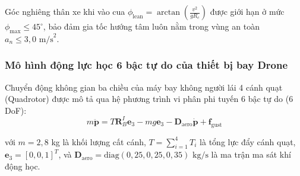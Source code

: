\begin{table}[H]
\centering
\caption{Đặc tính động học quay vòng của mô hình xe máy theo các góc bẻ lái $\delta_{\text{steer}}$}
\label{tab:motorcycle-turning-kinematics}
\end{table}

Góc nghiêng thân xe khi vào cua $\phi_{\text{lean}} = \arctan\left(\frac{v^2}{g R_c}\right)$ được giới hạn ở mức $\phi_{\max} \le 45^\circ$, bảo đảm gia tốc hướng tâm luôn nằm trong vùng an toàn $a_n \le 3{,}0\text{ m/s}^2$.

\subsubsection{Mô hình động lực học 6 bậc tự do của thiết bị bay Drone}

\hspace{0.5cm} Chuyển động không gian ba chiều của máy bay không người lái 4 cánh quạt (Quadrotor) được mô tả qua hệ phương trình vi phân phi tuyến 6 bậc tự do (6 DoF):
\begin{equation}
m \ddot{\mathbf{p}} = T \mathbf{R}_B^I \mathbf{e}_3 - m g \mathbf{e}_3 - \mathbf{D}_{\text{aero}} \dot{\mathbf{p}} + \mathbf{f}_{\text{gust}}
\label{eq:drone-6dof-translational-dynamics}
\end{equation}

với $m = 2{,}8$ kg là khối lượng cất cánh, $T = \sum_{i=1}^4 T_i$ là tổng lực đẩy cánh quạt, $\mathbf{e}_3 = [0, 0, 1]^T$, và $\mathbf{D}_{\text{aero}} = \text{diag}(0{,}25, 0{,}25, 0{,}35)\text{ kg/s}$ là ma trận ma sát khí động học.

